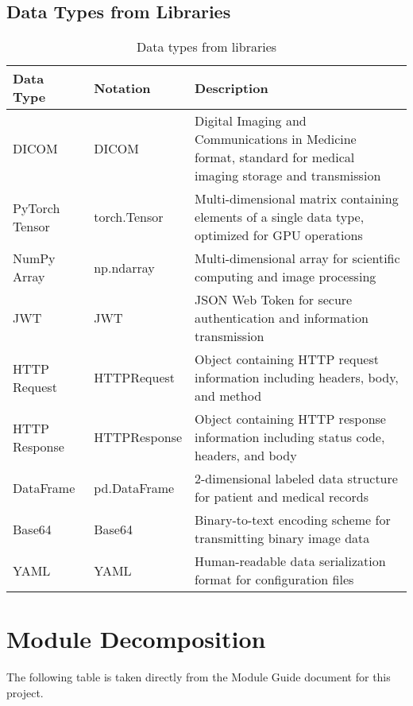 \documentclass[12pt, titlepage]{article}
\begin{document}
\subsection{Data Types from Libraries}
\begin{table}[H]
    \centering
    \renewcommand{\arraystretch}{1.2}
    \noindent
    \begin{tabular}{l l p{7.5cm}}
    \toprule
    \textbf{Data Type} & \textbf{Notation} & \textbf{Description} \\
    \midrule
    DICOM & DICOM & Digital Imaging and Communications in Medicine format, standard for medical imaging storage and transmission \\
    PyTorch Tensor & torch.Tensor & Multi-dimensional matrix containing elements of a single data type, optimized for GPU operations \\
    NumPy Array & np.ndarray & Multi-dimensional array for scientific computing and image processing \\
    JWT & JWT & JSON Web Token for secure authentication and information transmission \\
    HTTP Request & HTTPRequest & Object containing HTTP request information including headers, body, and method \\
    HTTP Response & HTTPResponse & Object containing HTTP response information including status code, headers, and body \\
    DataFrame & pd.DataFrame & 2-dimensional labeled data structure for patient and medical records \\
    Base64 & Base64 & Binary-to-text encoding scheme for transmitting binary image data \\
    YAML & YAML & Human-readable data serialization format for configuration files \\
    \bottomrule
    \end{tabular}
    \caption{Data types from libraries}
    \end{table}

\section{Module Decomposition}

The following table is taken directly from the Module Guide document for this project.
\end{document}
